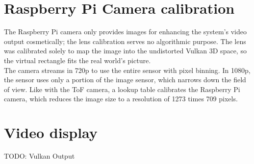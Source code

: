 \section{Raspberry Pi Camera calibration}
\label{sec:RBPiCalibration}
The Raspberry Pi camera only provides images for enhancing the system's video output cosmetically; the lens calibration serves no algorithmic purpose. The lens was calibrated solely to map the image into the undistorted Vulkan 3D space, so the virtual rectangle fits the real world's picture.\\
The camera streams in 720p to use the entire sensor with pixel binning. In 1080p, the sensor uses only a portion of the image sensor, which narrows down the field of view. Like with the ToF camera, a lookup table calibrates the Raspberry Pi camera, which reduces the image size to a resolution of 1273 times 709 pixels.
\section{Video display}
\label{sec:VideoDisplay}
TODO: Vulkan Output